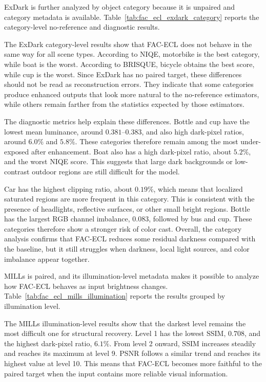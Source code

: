 ExDark is further analyzed by object category because it is unpaired and category metadata is available. Table~\ref{tab:fac_ecl_exdark_category} reports the category-level no-reference and diagnostic results.



The ExDark category-level results show that FAC-ECL does not behave in the same way for all scene types. According to NIQE, motorbike is the best category, while boat is the worst. According to BRISQUE, bicycle obtains the best score, while cup is the worst. Since ExDark has no paired target, these differences should not be read as reconstruction errors. They indicate that some categories produce enhanced outputs that look more natural to the no-reference estimators, while others remain farther from the statistics expected by those estimators.

The diagnostic metrics help explain these differences. Bottle and cup have the lowest mean luminance, around $0.381$--$0.383$, and also high dark-pixel ratios, around $6.0\%$ and $5.8\%$. These categories therefore remain among the most under-exposed after enhancement. Boat also has a high dark-pixel ratio, about $5.2\%$, and the worst NIQE score. This suggests that large dark backgrounds or low-contrast outdoor regions are still difficult for the model.

Car has the highest clipping ratio, about $0.19\%$, which means that localized saturated regions are more frequent in this category. This is consistent with the presence of headlights, reflective surfaces, or other small bright regions. Bottle has the largest RGB channel imbalance, $0.083$, followed by bus and cup. These categories therefore show a stronger risk of color cast. Overall, the category analysis confirms that FAC-ECL reduces some residual darkness compared with the baseline, but it still struggles when darkness, local light sources, and color imbalance appear together.

MILLs is paired, and its illumination-level metadata makes it possible to analyze how FAC-ECL behaves as input brightness changes. Table~\ref{tab:fac_ecl_mills_illumination} reports the results grouped by illumination level.



The MILLs illumination-level results show that the darkest level remains the most difficult one for structural recovery. Level 1 has the lowest SSIM, $0.708$, and the highest dark-pixel ratio, $6.1\%$. From level 2 onward, SSIM increases steadily and reaches its maximum at level 9. PSNR follows a similar trend and reaches its highest value at level 10. This means that FAC-ECL becomes more faithful to the paired target when the input contains more reliable visual information.

